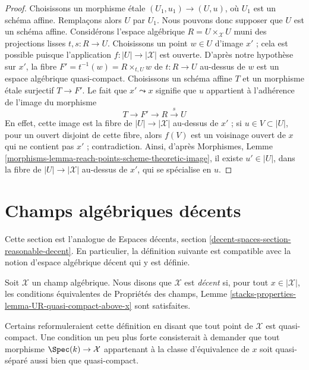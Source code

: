 \begin{proof}
Choisissons un morphisme \'etale $(U_1, u_1) \to (U, u)$, où $U_1$
est un schéma affine. Remplaçons alors $U$ par $U_1$.
Nous pouvons donc supposer que $U$ est un schéma affine.
Considérons l'espace algébrique $R = U \times_\mathcal{X} U$
muni des projections lisses $t, s : R \to U$.
Choisissons un point $w \in U$ d'image $x'$ ; cela est possible puisque
l'application $f : |U| \to |\mathcal{X}|$ est ouverte.
D'après notre hypothèse sur $x'$, la fibre
$F' = t^{-1}(w) = R \times_{t, U} w$
de $t : R \to U$ au-dessus de $w$ est un espace algébrique quasi-compact.
Choisissons un schéma affine $T$ et un morphisme \'etale surjectif
$T \to F'$. Le fait que $x' \leadsto x$ signifie que $u$ appartient à
l'adhérence de l'image du morphisme
$$
T \to F' \to R \xrightarrow{s} U
$$
En effet, cette image est la fibre de $|U| \to |\mathcal{X}|$
au-dessus de $x'$ ; si $u \in V \subset |U|$, pour un ouvert disjoint
de cette fibre, alors $f(V)$ est un voisinage ouvert de $x$
qui ne contient pas $x'$ ; contradiction.
Ainsi, d'après Morphismes, Lemme
\ref{morphisms-lemma-reach-points-scheme-theoretic-image},
il existe $u' \in |U|$, dans la fibre
de $|U| \to |\mathcal{X}|$ au-dessus de $x'$, qui se spécialise en $u$.
\end{proof}


\section{Champs algébriques décents}
\label{section-reasonable-decent}

\noindent
Cette section est l'analogue de
Espaces décents, section \ref{decent-spaces-section-reasonable-decent}.
En particulier, la définition suivante est compatible avec
la notion d'espace algébrique décent qui y est définie.

\begin{definition}
\label{definition-decent}
Soit $\mathcal{X}$ un champ algébrique. Nous disons que $\mathcal{X}$ est
{\it décent} si, pour tout $x \in |\mathcal{X}|$, les conditions équivalentes
de Propriétés des champs, Lemme
\ref{stacks-properties-lemma-UR-quasi-compact-above-x} sont satisfaites.
\end{definition}

\noindent
Certains reformuleraient cette définition en disant que
tout point de $\mathcal{X}$ est quasi-compact.
Une condition un peu plus forte consisterait à demander que tout morphisme
$\Spec(k) \to \mathcal{X}$ appartenant à la classe d'équivalence de $x$ soit
quasi-séparé aussi bien que quasi-compact.

